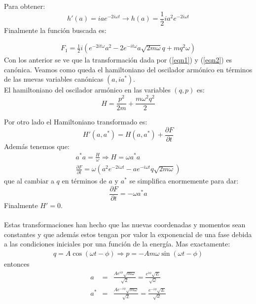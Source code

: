 \documentclass[letterpaper,12pt]{article}
\begin{document}
Para obtener:
\begin{equation}
h'(a)= i a e^{-2 i \omega  t} \longrightarrow h(a)=\frac{1}{2} i a^2 e^{-2 i \omega t }
\end{equation}
Finalmente la funci\'on buscada es:

\begin{eqnarray}
F_1=\frac{1}{2} i \left(e^{-2 i t \omega } a^2-2 e^{-i t \omega } a \sqrt{2 m \omega } q +m q^2 \omega \right)
\end{eqnarray}
Con los anterior se ve que la transformaci\'on dada por (\ref{eqn1}) y (\ref{eqn2}) es can\'onica. Veamos como queda el hamiltoniano del oscilador arm\'onico en t\'erminos de las nuevas variables can\'onicas $(a,ia^*)$.\\
El hamiltoniano del oscilador arm\'onico en las variables $(q,p)$ es:
\begin{equation}
H=\frac{p^2}{2m}+\frac{m \omega^2 q^2}{2}
\end{equation}

Por otro lado el Hamiltoniano  transformado es:
\begin{equation}
H'(a,a^*)=H(a,a^*)+\frac{\partial F}{\partial t}
\end{equation}
Adem\'as tenemos que:
\begin{eqnarray}
a^* a=\frac{H}{\omega} \Longrightarrow H=\omega  a^* a \\
\frac{\partial F}{\partial t}=\omega \left( a^2 e^{-2 i \omega t}  - a e^{-i  \omega  t  } q   \sqrt{2 m \omega } \right)
\end{eqnarray}
que al cambiar a $q$ en t\'erminos de $a$ y $a^*$ se simplifica enormemente para dar:
\begin{equation}
\frac{\partial F}{\partial t}=- \omega a^* a 
\end{equation}
Finalmente $H'=0$. \\
\\
Estas transformaciones han hecho que las nuevas coordenadas y momentos sean constantes y que adem\'as estos tengan por valor la exponencial de una fase debida a las condiciones iniciales por una funci\'on de la energ\'ia. Mas exactamente:
\begin{eqnarray}
 q=A \cos (\omega t-\phi )\Longrightarrow   p=-A m \omega  \sin (\omega t-\phi)
\end{eqnarray}
 entonces 
\begin{eqnarray}
a&=&\frac{A e^{i \phi } \sqrt{m \omega }}{\sqrt{2}}=\frac{e^{i \phi } \sqrt{E}}{\sqrt{ \omega}}\\
a^*&=&\frac{A e^{-i \phi } \sqrt{m \omega }}{\sqrt{2}}=\frac{ e^{-i \phi } \sqrt{E}}{\sqrt{ \omega} }
\end{eqnarray}
\end{document}
